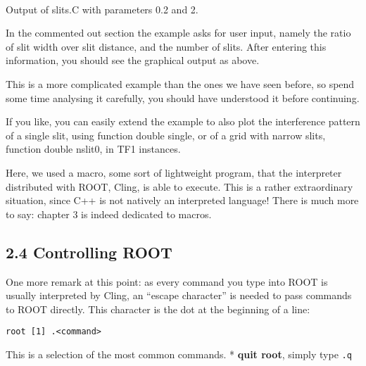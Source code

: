 \documentclass{article}
\begin{document}
    \begin{center}
    \end{center}
    { \hspace*{\fill} \\}
    
    Output of slits.C with parameters 0.2 and 2.

In the commented out section the example asks for user input, namely the
ratio of slit width over slit distance, and the number of slits. After
entering this information, you should see the graphical output as above.

This is a more complicated example than the ones we have seen before, so
spend some time analysing it carefully, you should have understood it
before continuing.

If you like, you can easily extend the example to also plot the
interference pattern of a single slit, using function double single, or
of a grid with narrow slits, function double nslit0, in TF1 instances.

Here, we used a macro, some sort of lightweight program, that the
interpreter distributed with ROOT, Cling, is able to execute. This is a
rather extraordinary situation, since C++ is not natively an interpreted
language! There is much more to say: chapter 3 is indeed dedicated to
macros.

\subsection{2.4 Controlling ROOT}\label{controlling-root}

One more remark at this point: as every command you type into ROOT is
usually interpreted by Cling, an ``escape character'' is needed to pass
commands to ROOT directly. This character is the dot at the beginning of
a line:

\begin{verbatim}
root [1] .<command>
\end{verbatim}

This is a selection of the most common commands. * \textbf{quit root},
simply type \texttt{.q}
\end{document}
